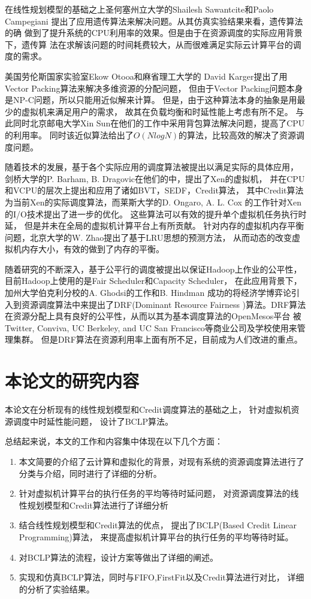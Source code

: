 在线性规划模型的基础之上圣何塞州立大学的Shailesh Sawantcite\cite{ref11}和Paolo Campegiani
\cite{ref12}提出了应用遗传算法来解决问题。从其仿真实验结果来看，遗传算法的确
做到了提升系统的CPU利用率的效果。但是由于在资源调度的实际应用背景下，遗传算
法在求解该问题的时间耗费较大，从而很难满足实际云计算平台的调度的需求。

美国劳伦斯国家实验室Ekow Otooa\cite{ref13}和麻省理工大学的
David Karger\cite{ref14}提出了用Vector Packing算法来解决多维资源的分配问题，
但由于Vector Packing问题本身是NP-C问题，所以只能用近似解来计算。
但是，由于这种算法本身的抽象是用最少的虚拟机来满足用户的需求，
故其在负载均衡和时延性能上考虑有所不足。
与此同时北京邮电大学Xin Sun在他们的工作中\cite{ref9}采用背包算法解决问题，提高了CPU的利用率。
同时该近似算法给出了$O(NlogN)$的算法，比较高效的解决了资源调度问题。

随着技术的发展，基于各个实际应用的调度算法被提出以满足实际的具体应用，
剑桥大学的P. Barham, B. Dragovic在他们的\cite{ref4}中，提出了Xen的虚拟机，
并在CPU和VCPU的层次上提出和应用了诸如BVT\cite{ref27}，SEDF，Credit算法\cite{ref23}，
其中Credit算法为当前Xen的实际调度算法，而莱斯大学的D. Ongaro, A. L. Cox
的工作\cite{ref5}针对Xen的I/O技术提出了进一步的优化。
这些算法可以有效的提升单个虚拟机任务执行时延，
但是并未在全局的虚拟机计算平台上有所贡献。
针对内存的虚拟机内存平衡问题，北京大学的W. Zhao\cite{ref8}提出了基于LRU思想的预测方法，
从而动态的改变虚拟机内存大小，有效的做到了内存的平衡。

随着研究的不断深入，基于公平行的调度被提出以保证Hadoop上作业的公平性，
目前Hadoop上使用的是Fair Scheduler\cite{ref24}和Capacity Scheduler\cite{ref25}，
在此应用背景下，加州大学伯克利分校的A. Ghodsi的工作\cite{ref7}和B. Hindman\cite{ref6}
成功的将经济学博弈论引入到资源调度算法中来提出了DRF(Dominant Resource Fairness
)算法。DRF算法在资源分配上具有良好的公平性，从而以其为基本调度算法的OpenMesos平台
被Twitter, Conviva, UC Berkeley, and UC San Francisco等商业公司及学校使用来管理集群。
但是DRF算法在资源利用率上面有所不足，目前成为人们改进的重点。

\section{本论文的研究内容}
本论文在分析现有的线性规划模型和Credit调度算法的基础之上，
针对虚拟机资源调度中时延性能问题，
设计了BCLP算法。

总结起来说，本文的工作和内容集中体现在以下几个方面：
\begin{enumerate}
  \item 本文简要的介绍了云计算和虚拟化的背景，对现有系统的资源调度算法进行了
	分类与介绍，同时进行了详细的分析。
  \item 针对虚拟机计算平台的执行任务的平均等待时延问题，
	对资源调度算法的线性规划模型和Credit算法进行了详细分析
  \item 结合线性规划模型和Credit算法的优点，
	提出了BCLP(Based Credit Linear Programming)算法，
	来提高虚拟机计算平台的执行任务的平均等待时延。
  \item 对BCLP算法的流程，设计方案等做出了详细的阐述。
  \item 实现和仿真BCLP算法，同时与FIFO,FirstFit以及Credit算法进行对比，
	详细的分析了实验结果。
\end{enumerate}


